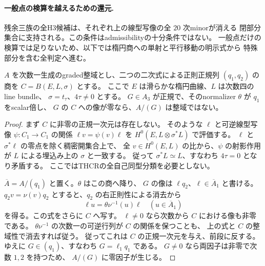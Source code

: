 \paragraph{一般点の検算を越えるための還元.}
残余三族の全H3候補は、それぞれ上の線型写像の全 $20$ 次minorが消える
閉部分集合に支持される。この条件はadmissibilityの十分条件ではない。
一般点だけの検算では足りないため、以下では楕円商への単射と平行移動の明示式から
特殊部分を含む全判定へ進む。

\begin{lemma}[楕円商で消える三次は整域切断にならない]
\label{lem:elliptic-normal-sequence-cubic}
$A$ を次数一生成のgraded整域とし、二つの二次式による正則正規列
$(q_1,q_2)$ の商を $C=B(E,L,\sigma)$ とする。
ここで $E$ は滑らかな楕円曲線、$L$ は次数四のline bundle、
$\sigma=t_\tau$、$4\tau\ne0$ とする。
$G\in A_3$ が正規で、そのnormalizer $\theta$ が $q_1$ をscalar倍し、
$G$ の $C$ への像が零なら、$A/(G)$ は整域ではない。
\end{lemma}
\begin{proof}
まず $C$ に非零の正規一次元は存在しない。
そのような $\ell$ と可逆線型写像 $\psi:C_1\to C_1$ の関係
$\ell v=\psi(v)\ell$ を $H^0(E,L\otimes\sigma^*L)$ で評価する。
$\ell$ と $\sigma^*\ell$ の零点を除く稠密開集合上で、
全 $v\in H^0(E,L)$ の比から、$\psi$ の射影作用が
$L$ による埋込み上の $\sigma$ と一致する。
従って $\sigma^*L\simeq L$、すなわち $4\tau=0$ となり矛盾する。
ここではTHCRの全自己同型分類を必要としない。

$\overline A=A/(q_1)$ と置く。$\theta$ はこの商へ降り、
$G$ の像は $\ell q_2$、$\ell\in\overline A_1$ と書ける。
$q_2 v=\nu(v)q_2$ とすると、$q_2$ の右正則性による消去から
\[
 \ell u=\theta\nu^{-1}(u)\ell\quad(u\in\overline A_1)
\]
を得る。この式をさらに $C$ へ写す。
$\ell\ne0$ なら次数から $C$ における像も非零である。
$\theta\nu^{-1}$ の次数一の可逆行列が $C$ の関係を保つことも、
上の式と $C$ の整域性で消去すれば従う。
従ってこれは $C$ の正規一次元を与え、前段に反する。
ゆえに $G\in(q_1)$、すなわち $G=\ell_1q_1$ である。
$G\ne0$ なら両因子は非零で次数 $1,2$ を持つため、
$A/(G)$ に零因子が生じる。
\end{proof}


